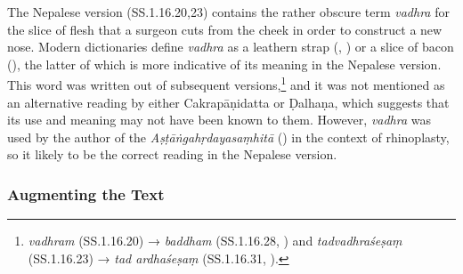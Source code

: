 The Nepalese version (SS.1.16.20,23) contains the rather obscure term 
\emph{vadhra} for the slice of flesh that a surgeon cuts from the cheek in order 
to construct a new nose. Modern dictionaries define \emph{vadhra} as a leathern 
strap (\cite[1385]{apte-prac}, \cite[917]{moni-sans}) or a slice of bacon 
(\cite[917]{moni-sans}), the latter of which is more indicative of its meaning in the 
Nepalese version. This word was written out of subsequent 
versions,\footnote{\emph{vadhram} (SS.1.16.20) → \emph{baddham} 
(SS.1.16.28, \cite[81]{vulgate}) and \emph{tadvadhraśeṣaṃ} (SS.1.16.23) → 
\emph{tad ardhaśeṣaṃ} (SS.1.16.31, \cite[81]{vulgate}).} and it was not 
mentioned as an alternative reading by either Cakrapāṇidatta or Ḍalhaṇa, which 
suggests that its use and meaning may not have been known to them. However, 
\emph{vadhra} was used by the author of the \emph{Aṣṭāṅgahṛdayasaṃhitā} 
() in the context of rhinoplasty, so it likely to be the correct 
reading in the Nepalese version. 

%

\subsubsection{Augmenting the Text}

